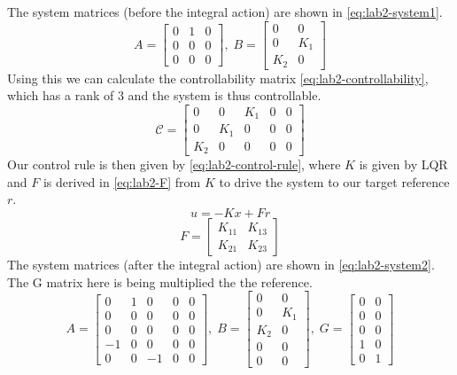 The system matrices (before the integral action) are shown in \ref{eq:lab2-system1}.
\begin{equation}
\label{eq:lab2-system1}
   A = \begin{bmatrix}
	0 & 1 & 0 \\
	0 & 0 & 0 \\
	0 & 0 & 0
   \end{bmatrix},\; 
   B = \begin{bmatrix}
	0 & 0 \\
	0 & K_1 \\
	K_2 & 0
   \end{bmatrix}
\end{equation}
Using this we can calculate the controllability matrix \ref{eq:lab2-controllability}, which has a rank of 3 and the system is thus controllable. 
\begin{equation}
\label{eq:lab2-controllability}
   \mathcal{C} = \begin{bmatrix}
	0 & 0 & K_1 & 0 & 0 \\
	0 & K_1 & 0 & 0 & 0 \\
	K_2 & 0 & 0 & 0 & 0
   \end{bmatrix}
\end{equation}
Our control rule is then given by \ref{eq:lab2-control-rule}, where $K$ is given by LQR and $F$ is derived in \ref{eq:lab2-F} from $K$ to drive the system to our target reference $r$.
\begin{equation}
\label{eq:lab2-control-rule}
   u = -Kx + Fr
\end{equation}
\begin{equation}
\label{eq:lab2-F}
   F = \begin{bmatrix}
	K_{11} & K_{13} \\
	K_{21} & K_{23}
   \end{bmatrix}
\end{equation}
The system matrices (after the integral action) are shown in \ref{eq:lab2-system2}. 
The G matrix here is being multiplied the the reference.
\begin{equation}
\label{eq:lab2-system2}
	A = \begin{bmatrix}
		0 & 1 & 0 & 0 & 0 \\
		0 & 0 & 0 & 0 & 0 \\
		0 & 0 & 0 & 0 & 0 \\
		-1 & 0 & 0 & 0 & 0 \\
		0 & 0 & -1 & 0 & 0 
	\end{bmatrix},\;
	B = \begin{bmatrix}
		0 & 0 \\
		0 & K_1 \\
		K_2 & 0 \\ 
		0 & 0 \\ 
		0 & 0
	\end{bmatrix},\; 
	G = \begin{bmatrix}
		0 & 0 \\
		0 & 0 \\
		0 & 0 \\
		1 & 0 \\ 
		0 & 1
	\end{bmatrix}
\end{equation}

